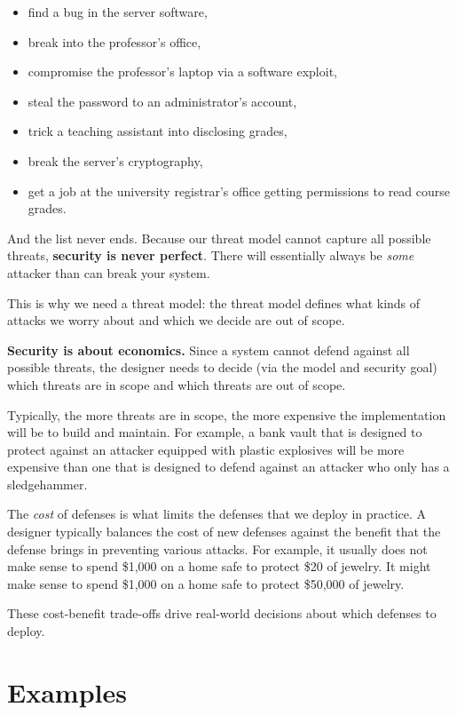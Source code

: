 \documentclass[
  letterpaper,
]{scrbook}
\providecommand{\tightlist}{%
  \setlength{\itemsep}{0pt}\setlength{\parskip}{0pt}}
\theoremstyle{definition}
\theoremstyle{plain}
\theoremstyle{plain}
\theoremstyle{remark}
\begin{document}
\begin{itemize}
\tightlist
\item
  find a bug in the server software,
\item
  break into the professor's office,
\item
  compromise the professor's laptop via a software exploit,
\item
  steal the password to an administrator's account,
\item
  trick a teaching assistant into disclosing grades,
\item
  break the server's cryptography,
\item
  get a job at the university registrar's office getting permissions to
  read course grades.
\end{itemize}

And the list never ends. Because our threat model cannot capture all
possible threats, \textbf{security is never perfect}. There will
essentially always be \emph{some} attacker than can break your system.

This is why we need a threat model: the threat model defines what kinds
of attacks we worry about and which we decide are out of scope.

\textbf{Security is about economics.} Since a system cannot defend
against all possible threats, the designer needs to decide (via the
model and security goal) which threats are in scope and which threats
are out of scope.

Typically, the more threats are in scope, the more expensive the
implementation will be to build and maintain. For example, a bank vault
that is designed to protect against an attacker equipped with plastic
explosives will be more expensive than one that is designed to defend
against an attacker who only has a sledgehammer.

The \emph{cost} of defenses is what limits the defenses that we deploy
in practice. A designer typically balances the cost of new defenses
against the benefit that the defense brings in preventing various
attacks. For example, it usually does not make sense to spend \$1,000 on
a home safe to protect \$20 of jewelry. It might make sense to spend
\$1,000 on a home safe to protect \$50,000 of jewelry.

These cost-benefit trade-offs drive real-world decisions about which
defenses to deploy.

\section{Examples}\label{examples}
\end{document}
